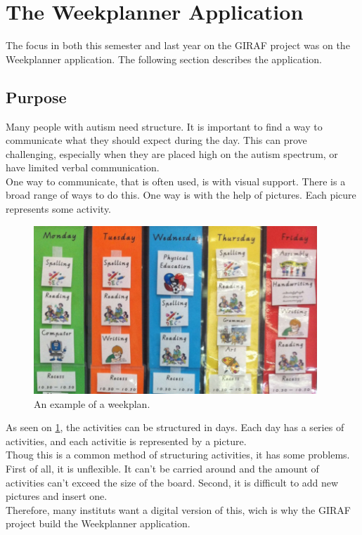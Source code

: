 \section{The Weekplanner Application}

The focus in both this semester and last year on the GIRAF project was on the Weekplanner application. The following section describes the application.\\

\subsection{Purpose}
Many people with autism need structure. It is important to find a way to communicate what they should expect during the day. This can prove challenging, especially when they are placed high on the autism spectrum, or have limited verbal communication.\\
One way to communicate, that is often used, is with visual support\cite{VisualSupport}. There is a broad range of ways to do this. One way is with the help of pictures. Each picure represents some activity.

\begin{figure}[H]
    \begin{center}
        \includegraphics[width=0.95\textwidth]{figures/WeekPlanEks.png}
    \end{center}
    \caption{An example of a weekplan.\cite{VisualSupport}}
    \label{fig:WeekPlan}
\end{figure}

As seen on \ref{fig:WeekPlan}, the activities can be structured in days. Each day has a series of activities, and each activitie is represented by a picture.\\
Thoug this is a common method of structuring activities, it has some problems. First of all, it is unflexible. It can't be carried around and the amount of activities can't exceed the size of the board. Second, it is difficult to add new pictures and insert one.\\
Therefore, many instituts want a digital version of this, wich is why the GIRAF project build the Weekplanner application.\\

